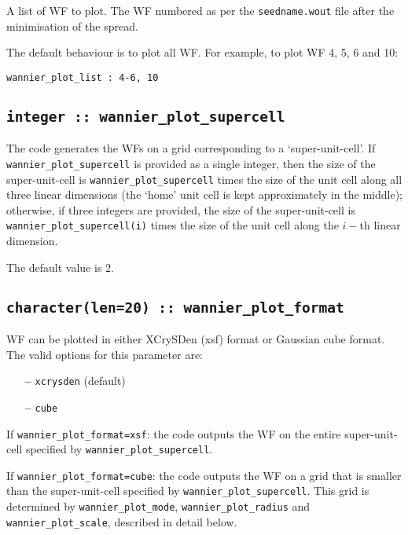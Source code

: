  A list of WF to plot. The WF numbered
 as per the {\tt seedname.wout} file after the minimisation of the
 spread.

 The default behaviour is to plot all WF. For example,
 to plot WF 4, 5, 6 and 10:

 \verb#wannier_plot_list : 4-6, 10#


\subsection[wannier\_plot\_supercell]{\tt integer :: wannier\_plot\_supercell}

The code generates the WFs on a grid corresponding to a `super-unit-cell'.
If \verb#wannier_plot_supercell# is provided as a single integer,
then the size of the super-unit-cell is \verb#wannier_plot_supercell# times
the size of the unit cell along all three linear dimensions (the `home' unit cell
is kept approximately in the middle); otherwise, if three integers are
provided, the size of the super-unit-cell is \verb#wannier_plot_supercell(i)#
times the size of the unit cell along the $i-$th linear dimension.

The default value is 2.


\subsection[wannier\_plot\_format]{\tt character(len=20) :: wannier\_plot\_format}

WF can be plotted in either XCrySDen (xsf) format or Gaussian cube
format. The valid options for this parameter are:
\begin{itemize}
\item[{\bf --}] \verb#xcrysden# (default)
\item[{\bf --}] \verb#cube#
\end{itemize}

If {\tt wannier\_plot\_format=xsf}: the code outputs the WF on the entire super-unit-cell
specified by {\tt wannier\_plot\_supercell}.

If {\tt wannier\_plot\_format=cube}: the code outputs the WF on a grid that is smaller
than the super-unit-cell specified by {\tt wannier\_plot\_supercell}. This grid is
determined by {\tt wannier\_plot\_mode}, {\tt wannier\_plot\_radius} and {\tt wannier\_plot\_scale},
described in detail below.

